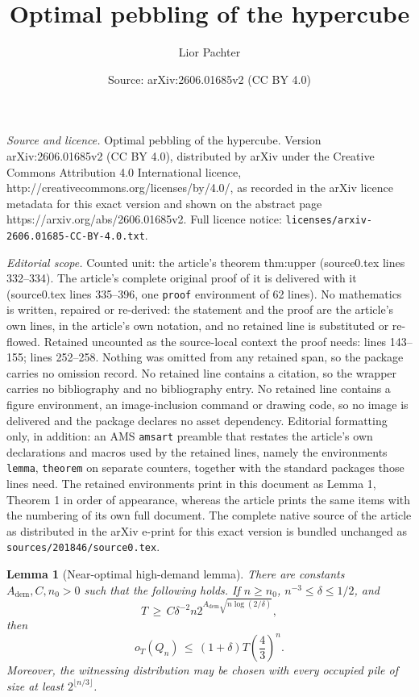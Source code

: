 \documentclass[10pt,a4paper]{amsart}
\title{Optimal pebbling of the hypercube}
\author{Lior Pachter}
\date{Source: arXiv:2606.01685v2 (CC BY 4.0)}
\newtheorem{lemma}{Lemma}
\newcommand{\Adem}{A_{\mathrm{dem}}}
\begin{document}
\maketitle

\noindent\emph{Source and licence.} Optimal pebbling of the hypercube. Version arXiv:2606.01685v2 (CC BY 4.0), distributed by arXiv under the Creative Commons Attribution 4.0 International licence, http://creativecommons.org/licenses/by/4.0/, as recorded in the arXiv licence metadata for this exact version and shown on the abstract page https://arxiv.org/abs/2606.01685v2. Full licence notice: \texttt{licenses/arxiv-2606.01685-CC-BY-4.0.txt}.\par\smallskip

\noindent\textit{Editorial scope.} Counted unit: the article's theorem thm:upper (source0.tex lines 332--334). The article's complete original proof of it is delivered with it (source0.tex lines 335--396, one \texttt{proof} environment of 62 lines). No mathematics is written, repaired or re-derived: the statement and the proof are the article's own lines, in the article's own notation, and no retained line is substituted or re-flowed.  Retained uncounted as the source-local context the proof needs: lines 143--155; lines 252--258.  Nothing was omitted from any retained span, so the package carries no omission record.  No retained line contains a citation, so the wrapper carries no bibliography and no bibliography entry.  No retained line contains a figure environment, an image-inclusion command or drawing code, so no image is delivered and the package declares no asset dependency.  Editorial formatting only, in addition: an AMS \texttt{amsart} preamble that restates the article's own declarations and macros used by the retained lines, namely the environments \texttt{lemma}, \texttt{theorem} on separate counters, together with the standard packages those lines need.  The retained environments print in this document as Lemma 1, Theorem 1 in order of appearance, whereas the article prints the same items with the numbering of its own full document.  The complete native source of the article as distributed in the arXiv e-print for this exact version is bundled unchanged as \texttt{sources/201846/source0.tex}.
\begin{lemma}[Near-optimal high-demand lemma]\label{lem:high-demand}
There are constants $\Adem,C,n_0>0$ such that the following holds.  If $n\ge n_0$,
$n^{-3}\le \delta\le 1/2$, and
\[
T\,\ge\, C\delta^{-2}n2^{\Adem\sqrt{n\log(2/\delta)}},
\]
then
\[
o_T(Q_n)\,\le\, (1+\delta)T\left(\frac43\right)^n.
\]
Moreover, the witnessing distribution may be chosen with every occupied pile of size at
least $2^{\lfloor n/3\rfloor}$.
\end{lemma}
\end{document}
